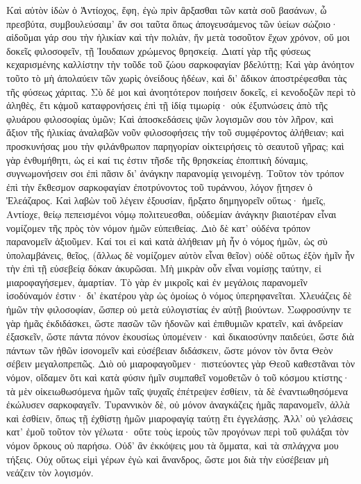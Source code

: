 Καὶ αὐτὸν ἰδὼν ὁ Ἀντίοχος, ἔφη, 
ἐγὼ πρὶν ἂρξασθαι τῶν κατὰ σοῦ βασάνων, ὦ πρεσβύτα, συμβουλεύσαιμ' ἄν σοι ταῦτα ὅπως ἀπογευσάμενος τῶν ὑείων σώζοιο· αἰδοῦμαι γάρ σου τὴν ἡλικίαν καὶ τὴν πολιὰν, ἥν μετὰ τοσοῦτον ἔχων χρόνον, οὔ μοι δοκεῖς φιλοσοφεῖν, τῇ Ἰουδαιων χρώμενος θρησκείᾳ. 
Διατί γὰρ τῆς φύσεως κεχαρισμένης καλλίστην τὴν τοῦδε τοῦ ζώου σαρκοφαγίαν βδελύττῃ; 
Καὶ γὰρ ἀνόητον τοῦτο τὸ μὴ ἀπολαύειν τῶν χωρὶς ὀνείδους ἡδέων, καὶ δι' ἄδικον ἀποστρέφεσθαι τὰς τῆς φύσεως χάριτας. 
Σὺ δέ μοι καὶ ἀνοητότερον ποιήσειν δοκεῖς, εἰ κενοδοξῶν περὶ τὸ ἀληθὲς, 
ἔτι κᾀμοῦ καταφρονήσεις ἐπὶ τῇ ἰδίᾳ τιμωρίᾳ· οὐκ ἐξυπνώσεις ἀπὸ τῆς φλυάρου φιλοσοφίας ὑμῶν; 
Καὶ ἀποσκεδάσεις ψῶν λογισμῶν σου τὸν λῆρον, καὶ ἄξιον τῆς ἡλικίας ἀναλαβῶν νοῦν φιλοσοφήσεις τήν τοῦ συμφέροντος ἀλήθειαν; 
καὶ προσκυνήσας μου τὴν φιλάνθρωπον παρηγορίαν οἰκτειρήσεις τὸ σεαυτοῦ γῆρας; 
καὶ γὰρ ἐνθυμήθητι, ὡς εἰ καί τις ἐστιν τῆσδε τῆς θρησκείας ἐποπτικὴ δύναμις, συγνωμονήσειν σοι ἐπὶ πᾶσιν δι' ἀνάγκην παρανομίᾳ γεινομένῃ. 
Τοῦτον τὸν τρόπον ἐπὶ τὴν ἔκθεσμον σαρκοφαγίαν ἐποτρύνοντος τοῦ τυράννου, λόγον ᾔτησεν ὁ Ἐλεάζαρος. 
Καὶ λαβὼν τοῦ λέγειν ἐξουσίαν, ἤρξατο δημηγορεῖν οὕτως· 
ἡμεῖς, Αντίοχε, θείῳ πεπεισμένοι νόμῳ πολιτευεσθαι, οὐδεμίαν ἀνάγκην βιαιοτέραν εἶναι νομίζομεν τῆς πρὸς τὸν νόμον ἡμῶν εὐπειθείας. 
Διὸ δὲ κατ' οὐδένα τρόπον παρανομεῖν ἀξιοῦμεν. 
Καί τοι εἰ καὶ κατὰ ἀλήθειαν μὴ ἦν ὁ νόμος ἡμῶν, ὡς σὺ ὑπολαμβάνεις, θεῖος, (ἄλλως δὲ νομίζομεν αὐτὸν εἶναι θεῖον) οὐδὲ οὕτως ἐξὸν ἡμῖν ἦν τὴν ἐπὶ τῇ εὐσεβείᾳ δόκαν ἀκυρῶσαι. 
Μὴ μικρὰν οὖν εἶναι νομίσῃς ταύτην, εἰ μιαροφαγήσεμεν, ἁμαρτίαν. 
Τὸ γὰρ ἐν μικροῖς καὶ ἐν μεγάλοις παρανομεῖν ἰσοδύναμόν ἐστιν· 
δι' ἑκατέρου γὰρ ὡς ὁμοίως ὁ νόμος ὑπερηφανεῖται. 
Χλευάζεις δὲ ἡμῶν τὴν φιλοσοφίαν, ὥσπερ οὐ μετὰ εὐλογιστίας ἐν αὐτῇ βιούντων. 
Σωφροσύνην τε γὰρ ἡμᾶς ἐκδιδάσκει, ὥστε πασῶν τῶν ἡδονῶν καὶ ἐπιθυμιῶν κρατεῖν, καὶ ἀνδρείαν ἐξασκεῖν, ὥστε πάντα πόνον ἑκουσίως ὑπομένειν· 
καὶ δικαιοσύνην παιδεύει, ὥστε διὰ πάντων τῶν ἠθῶν ἰσονομεῖν καὶ εὐσέβειαν διδάσκειν, ὥστε μόνον τὸν ὄντα Θεὸν σέβειν μεγαλοπρεπῶς. 
Διὸ οὐ μιαροφαγοῦμεν· πιστεύοντες γὰρ Θεοῦ καθεστᾶναι τὸν νόμον, οἴδαμεν ὅτι καὶ κατὰ φύσιν ἡμῖν συμπαθεῖ νομοθετῶν ὁ τοῦ κόσμου κτίστης· 
τὰ μὲν οἰκειωθωσόμενα ἡμῶν ταῖς ψυχαῖς ἐπέτρεψεν ἐσθίειν, τὰ δὲ ἐναντιωθησόμενα ἐκώλυσεν σαρκοφαγεῖν. 
Τυραννικὸν δὲ, οὐ μόνον ἀναγκάζεις ἡμᾶς παρανομεῖν, ἀλλὰ καὶ ἐσθίειν, ὅπως τῇ ἐχθίστῃ ἡμῶν μιαροφαγίᾳ ταύτῃ ἔτι ἐγγελάσῃς. 
Ἀλλ' οὐ γελάσεις κατ' ἐμοῦ τοῦτον τὸν γέλωτα· 
οὔτε τοὺς ἱεροὺς τῶν προγόνων περὶ τοῦ φυλάξαι τὸν νόμον ὅρκους οὐ παρήσω. 
Οὐδ' ἂν ἐκκόψεις μου τὰ ὄμματα, καὶ τὰ σπλάγχνα μου τήξεις. 
Οὐχ οὕτως εἰμὶ γέρων ἐγὼ καὶ ἄνανδρος, ὥστε μοι διὰ τὴν εὐσέβειαν μὴ νεάζειν τὸν λογισμόν. 
